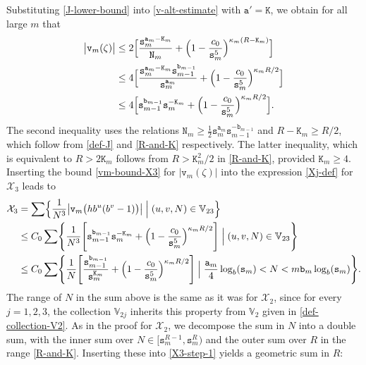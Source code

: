 \documentclass[12pt, twoside]{article}
\theoremstyle{definition}
\numberwithin{equation}{section}
\begin{document}
Substituting \eqref{J-lower-bound} into \eqref{v-alt-estimate} with $\mathtt a' = \mathtt K$, we obtain for all large $m$ that 
\begin{align} 
\bigl| \mathtt v_m(\zeta) \bigr| &\leq 2 \Bigl[ \frac{\mathtt s_m^{\mathtt a_m - \mathtt K_m}}{\mathtt N_m} + \Bigl(1 - \frac{c_0}{\mathtt s_m^5}\Bigr)^{\kappa_m(R - \mathtt K_m)} \Bigr] \nonumber \\
&\leq 4 \Bigl[ \frac{\mathtt s_m^{\mathtt a_m-\mathtt K_m} \mathtt s_{m-1}^{\mathtt b_{m-1}}}{\mathtt s_m^{\mathtt a_m}} + \Bigl(1 - \frac{c_0}{\mathtt s_m^5}\Bigr)^{\kappa_m R/2} \Bigr]  \nonumber \\ 
&\leq 4 \Bigl[\mathtt s_{m-1}^{\mathtt b_{m-1}} \mathtt s_m^{-\mathtt K_m} +  \Bigl(1 - \frac{c_0}{\mathtt s_m^5}\Bigr)^{\kappa_m R/2}  \Bigr]. \label{vm-bound-X3}
\end{align} 
The second inequality uses the relations $\mathtt N_m \geq \frac{1}{2}\mathtt s_m^{\mathtt a_m} \mathtt s_{m-1}^{-\mathtt b_{m-1}}$ and $R - \mathtt K_m \geq R/2$, which follow from \eqref{def-J} and \eqref{R-and-K} respectively. The latter inequality, which is equivalent to $R > 2\mathtt K_m$ follows from $R > \mathtt K_m^2/2$ in \eqref{R-and-K}, provided $\mathtt K_m \geq 4$. Inserting the bound \eqref{vm-bound-X3} for $\bigl|\mathtt v_m(\zeta) \bigr|$ into the expression \eqref{Xj-def} for $\mathcal X_3$ leads to 
\begin{align} 
\mathcal X_3 &= \sum \Bigl\{\frac{1}{N^3} \bigl|\mathtt v_m \bigl( hb^u(b^v-1)\bigr) \bigr| \; \Bigl| \; (u, v, N) \in \mathbb V_{23} \Bigr\} \nonumber \\ &\leq C_0 \sum \Biggl\{ \frac{1}{N^3} \Biggl[ \mathtt s_{m-1}^{\mathtt b_{m-1}} \mathtt s_m^{-\mathtt K_m} +  \Bigl(1 - \frac{c_0}{\mathtt s_m^5}\Bigr)^{\kappa_m R/2} \Biggr] \; \Bigl| \; (u, v, N) \in \mathbb V_{23} \Biggr\} \nonumber \\ 
&\leq C_0 \sum \Biggl\{ \frac{1}{N} \Biggl[ \frac{\mathtt s_{m-1}^{\mathtt b_{m-1}}}{\mathtt s_m^{\mathtt K_m}}  + \Bigl(1 - \frac{c_0}{\mathtt s_m^5}\Bigr)^{\kappa_m R/2} \Biggr] \; \Bigl| \; \frac{\mathtt a_m}{4} \log_b(\mathtt s_m) < N < m \mathtt b_m \log_b(\mathtt s_m)   \Biggr\}. \label{X3-step-1}
\end{align}
The range of $N$ in the sum above is the same as it was for $\mathcal X_2$, since for every $j = 1,2,3$, the collection $\mathbb V_{2j}$ inherits this property from $\mathbb V_2$ given in \eqref{def-collection-V2}. As in the proof for $\mathcal X_2$, we decompose the sum in $N$ into a double sum, with the inner sum over $N \in [\mathtt s_{m}^{R-1}, \mathtt s_m^R)$ and the outer sum over $R$ in the range \eqref{R-and-K}. Inserting these into \eqref{X3-step-1} yields a geometric sum in $R$:
\end{document}
